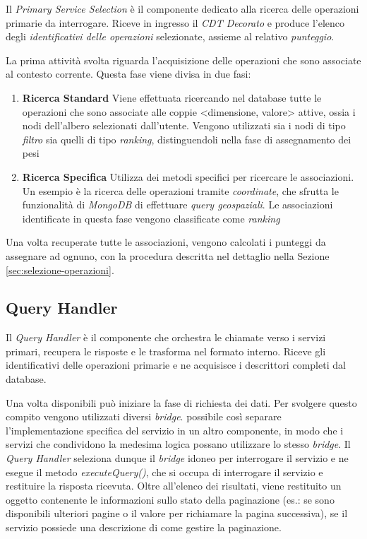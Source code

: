Il \emph{Primary Service Selection} è il componente dedicato alla ricerca delle operazioni primarie da interrogare. Riceve in ingresso il \emph{CDT Decorato} e produce l'elenco degli \emph{identificativi delle operazioni} selezionate, assieme al relativo \emph{punteggio}.

La prima attività svolta riguarda l'acquisizione delle operazioni che sono associate al contesto corrente. Questa fase viene divisa in due fasi:

\begin{enumerate}
	\item \textbf{Ricerca Standard}
	Viene effettuata ricercando nel database tutte le operazioni che sono associate alle coppie {<}dimensione, valore{>} attive, ossia i nodi dell'albero selezionati dall'utente. Vengono utilizzati sia i nodi di tipo \emph{filtro} sia quelli di tipo \emph{ranking}, distinguendoli nella fase di assegnamento dei pesi
	\item \textbf{Ricerca Specifica}
	Utilizza dei metodi specifici per ricercare le associazioni. Un esempio è la ricerca delle operazioni tramite \emph{coordinate}, che sfrutta le funzionalità di \emph{MongoDB} di effettuare \emph{query geospaziali}. Le associazioni identificate in questa fase vengono classificate come \emph{ranking}
\end{enumerate}

Una volta recuperate tutte le associazioni, vengono calcolati i punteggi da assegnare ad ognuno, con la procedura descritta nel dettaglio nella Sezione \ref{sec:selezione-operazioni}.

\subsection{Query Handler\label{sec:query-handler}}

Il \emph{Query Handler} è il componente che orchestra le chiamate verso i servizi primari, recupera le risposte e le trasforma nel formato interno. Riceve gli identificativi delle operazioni primarie e ne acquisisce i descrittori completi dal database.

Una volta disponibili può iniziare la fase di richiesta dei dati. Per svolgere questo compito vengono utilizzati diversi \emph{bridge}. \upe possibile così separare l'implementazione specifica del servizio in un altro componente, in modo che i servizi che condividono la medesima logica possano utilizzare lo stesso \emph{bridge}. Il \emph{Query Handler} seleziona dunque il \emph{bridge} idoneo per interrogare il servizio e ne esegue il metodo \emph{executeQuery()}, che si occupa di interrogare il servizio e restituire la risposta ricevuta. Oltre all'elenco dei risultati, viene restituito un oggetto contenente le informazioni sullo stato della paginazione (es.: se sono disponibili ulteriori pagine o il valore per richiamare la pagina successiva), se il servizio possiede una descrizione di come gestire la paginazione.

